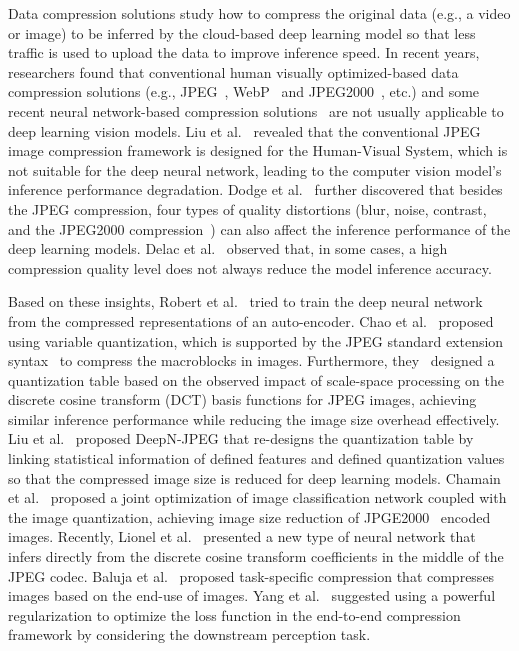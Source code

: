 Data compression solutions study how to compress the original data (e.g., a video or image) to be inferred by the cloud-based deep learning model so that less traffic is used to upload the data to improve inference speed. In recent years, researchers found that conventional human visually optimized-based data compression solutions (e.g., JPEG~\cite{jpeg}, WebP~\cite{calore2010meet} and JPEG2000~\cite{rabbani2002jpeg2000}, etc.) and some recent neural network-based compression solutions~\cite{toderici2017full, theis2017lossy, toderici2015variable, rippel2017real} are not usually applicable to deep learning vision models. Liu et al.~\cite{DeepN-JPEG} revealed that the conventional JPEG image compression framework is designed for the Human-Visual System, which is not suitable for the deep neural network, leading to the computer vision model's inference performance degradation. Dodge et al.~\cite{dodge2016understanding} further discovered that besides the JPEG compression, four types of quality distortions (blur, noise, contrast, and the JPEG2000 compression~\cite{rabbani2002jpeg2000}) can also affect the inference performance of the deep learning models. Delac et al.~\cite{delac2005effects} observed that, in some cases, a high compression quality level does not always reduce the model inference accuracy. %

Based on these insights, Robert et al.~\cite{torfason2018towards} tried to train the deep neural network from the compressed representations of an auto-encoder. Chao et al.~\cite{chao2011preserving} proposed using variable quantization, which is supported by the JPEG standard extension syntax~\cite{dis199110918} to compress the macroblocks in images. Furthermore, they~\cite{chao2013design} designed a quantization table based on the observed impact of scale-space processing on the discrete cosine transform (DCT) basis functions for JPEG images, achieving similar inference performance while reducing the image size overhead effectively. Liu et al.~\cite{DeepN-JPEG} proposed DeepN-JPEG that re-designs the quantization table by linking statistical information of defined features and defined quantization values so that the compressed image size is reduced for deep learning models. Chamain et al.~\cite{2019quannet} proposed a joint optimization of image classification network coupled with the image quantization, achieving image size reduction of JPGE2000~\cite{rabbani2002jpeg2000} encoded images. Recently, Lionel et al.~\cite{gueguen2018faster} presented a new type of neural network that infers directly from the discrete cosine transform coefficients in the middle of the JPEG codec. Baluja et al.~\cite{baluja2019task} proposed task-specific compression that compresses images based on the end-use of images. {\color{revise3}Yang et al.~\cite{endtoend} suggested using a powerful regularization to optimize the loss function in the end-to-end compression framework by considering the downstream perception task.} %

